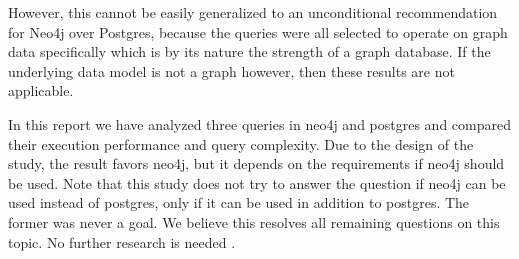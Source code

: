 \documentclass[11pt, a4paper,oneside,chapterprefix=false]{scrbook}
\begin{document}
However, this cannot be easily generalized to an unconditional recommendation for Neo4j over Postgres, because the queries were all selected to operate on graph data specifically which is by its nature the strength of a graph database.
If the underlying data model is not a graph however, then these results are not applicable.

In this report we have analyzed three queries in neo4j and postgres and compared their execution performance and query complexity. 
Due to the design of the study, the result favors neo4j, but it depends on the requirements if neo4j should be used.
Note that this study does not try to answer the question if neo4j can be used instead of postgres, only if it can be used in addition to postgres. The former was never a goal.
We believe this resolves all remaining questions on this topic. No further research is needed \cite{xkcdresearch}.



\end{document}
